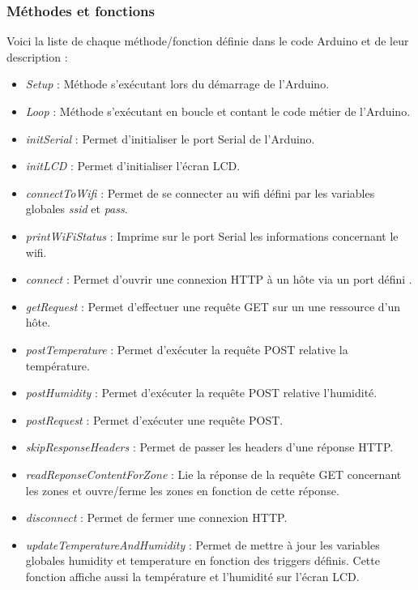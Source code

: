 \subsubsection{Méthodes et fonctions}
Voici la liste de chaque méthode/fonction définie dans le code Arduino et de leur description :
\begin{itemize}
\item \emph{Setup} : Méthode s’exécutant lors du démarrage de l’Arduino.
\item \emph{Loop} : Méthode s’exécutant en boucle et contant le code métier de l’Arduino.
\item \emph{initSerial} :  Permet d’initialiser le port Serial de l’Arduino.
\item \emph{initLCD} :   Permet d’initialiser l’écran LCD.
\item \emph{connectToWifi} : Permet de se connecter au wifi défini par les variables globales \emph{ssid} et \emph{pass}.
\item \emph{printWiFiStatus} : Imprime sur le port Serial les informations concernant le wifi.
\item \emph{connect} : Permet d’ouvrir une connexion HTTP à un hôte via un port défini  .
\item \emph{getRequest} : Permet d’effectuer une requête GET sur un une ressource d’un hôte.
\item \emph{postTemperature} : Permet d’exécuter la requête POST relative la température.
\item \emph{postHumidity} : Permet d’exécuter la requête POST relative l’humidité.
\item \emph{postRequest} : Permet d’exécuter une requête POST.
\item \emph{skipResponseHeaders} : Permet de passer les headers d’une réponse HTTP.
\item \emph{readReponseContentForZone} : Lie la réponse de la requête GET concernant les zones et ouvre/ferme les zones en fonction de cette réponse.
\item \emph{disconnect} : Permet de fermer une connexion HTTP.
\item \emph{updateTemperatureAndHumidity} : Permet de mettre à jour les variables globales humidity et temperature en fonction des triggers définis. Cette fonction affiche aussi la température et l’humidité sur l’écran LCD.
\end{itemize}
